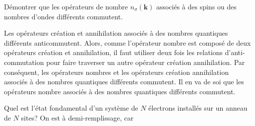 \documentclass{subfiles}[../main.tex]
\begin{document}
            \begin{problem}
                Démontrer que les opérateurs de nombre
                $n_\sigma(\bm{k})$ associés à des spins ou
                des nombres d'ondes différents commutent.
            \end{problem}
            Les opérateurs création et annihilation associés à des nombres
            quantiques différents
            anticommutent. Alors, comme l'opérateur
            nombre est composé de deux opérateurs création et annihilation,
            il faut utiliser deux fois les relations d'anti-commutation pour
            faire traverser un autre opérateur création annihilation. Par
            conséquent, les opérateurs nombres et les opérateurs création
            annihilation associés à des nombres quantiques différents commutent.
            Il en va de soi que les opérateurs nombre associés à des nombres
            quantiques différents commutent.

            \begin{problem}
                Quel est l'état fondamental d'un système de
                $N$ électrons installés sur un anneau de
                $N$ sites? On est à demi-remplissage, car

            \end{problem}




\end{document}
